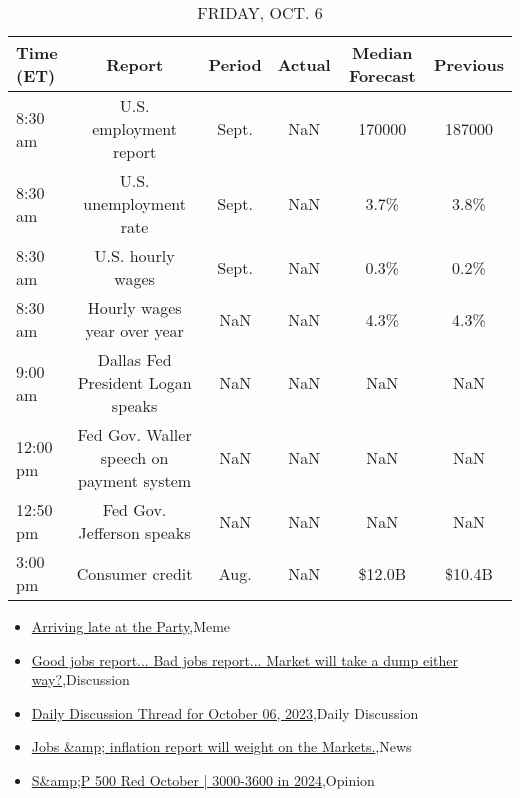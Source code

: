 \documentclass{article}%
\begin{document}
%


\begin{table}[htbp]%
\caption{FRIDAY, OCT. 6}%
\centering%
\begin{adjustbox}{width=1\textwidth}%
\begin{tabular}{lccccc}
\toprule
Time (ET) &                                   Report & Period & Actual & Median Forecast & Previous \\
\midrule
  8:30 am &                   U.S. employment report &  Sept. &    NaN &          170000 &   187000 \\
  8:30 am &                   U.S. unemployment rate &  Sept. &    NaN &            3.7\% &     3.8\% \\
  8:30 am &                        U.S. hourly wages &  Sept. &    NaN &            0.3\% &     0.2\% \\
  8:30 am &              Hourly wages year over year &    NaN &    NaN &            4.3\% &     4.3\% \\
  9:00 am &        Dallas Fed President Logan speaks &    NaN &    NaN &             NaN &      NaN \\
 12:00 pm & Fed Gov. Waller speech on payment system &    NaN &    NaN &             NaN &      NaN \\
 12:50 pm &                Fed Gov. Jefferson speaks &    NaN &    NaN &             NaN &      NaN \\
  3:00 pm &                          Consumer credit &   Aug. &    NaN &          \$12.0B &   \$10.4B \\
\bottomrule
\end{tabular}
%
\end{adjustbox}%
\end{table}

%
\begin{itemize}%
\item%
\href{https://reddit.com/r/wallstreetbets/comments/1719wa7/arriving\_late\_at\_the\_party/}{Arriving late at the Party},Meme%
\item%
\href{https://reddit.com/r/wallstreetbets/comments/17197hc/good\_jobs\_report\_bad\_jobs\_report\_market\_will\_take/}{Good jobs report... Bad jobs report... Market will take a dump either way?},Discussion%
\item%
\href{https://reddit.com/r/wallstreetbets/comments/1718cdb/daily\_discussion\_thread\_for\_october\_06\_2023/}{Daily Discussion Thread for October 06, 2023},Daily Discussion%
\item%
\href{https://reddit.com/r/StockMarket/comments/170t86k/jobs\_inflation\_report\_will\_weight\_on\_the\_markets/}{Jobs \&amp; inflation report will weight on the Markets.},News%
\item%
\href{https://reddit.com/r/StockMarket/comments/170op2i/sp\_500\_red\_october\_30003600\_in\_2024/}{S\&amp;P 500 Red October | 3000-3600 in 2024},Opinion%
\end{itemize}%
\end{document}

